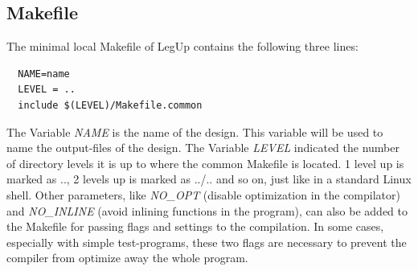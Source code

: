 \subsection{Makefile}
The minimal local Makefile of LegUp contains the following three lines:
\begin{verbatim}
  NAME=name
  LEVEL = ..
  include $(LEVEL)/Makefile.common
\end{verbatim}

The Variable \textit{NAME} is the name of the design. This variable will be used to name the output-files of the design. The Variable \textit{LEVEL} indicated the number of directory levels it is up to where the common Makefile is located. 1 level up is marked as .., 2 levels up is marked as ../.. and so on, just like in a standard Linux shell. Other parameters, like \textit{NO\_OPT} (disable optimization in the compilator) and \textit{NO\_INLINE} (avoid inlining functions in the program), can also be added to the Makefile for passing flags and settings to the compilation. In some cases, especially with simple test-programs, these two flags are necessary to prevent the compiler from optimize away the whole program.

